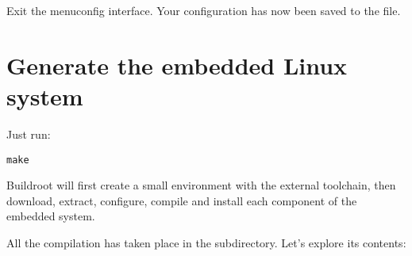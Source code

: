 Exit the menuconfig interface. Your configuration has now been saved
to the  file.

\section{Generate the embedded Linux system}

Just run:

\begin{verbatim}
make
\end{verbatim}

Buildroot will first create a small environment with the external
toolchain, then download, extract, configure, compile and install each
component of the embedded system.

All the compilation has taken place in the  subdirectory. Let's
explore its contents:


